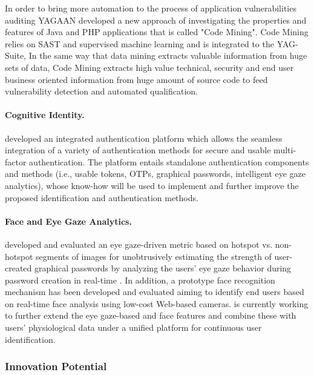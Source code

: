 \documentclass[a4paper,11pt]{article}
\begin{document}
In order to bring more automation to the process of application vulnerabilities auditing YAGAAN developed a new approach of investigating the properties and features of Java and PHP applications that is called "Code Mining". Code Mining relies on SAST and supervised machine learning and is integrated to the YAG-Suite, In the same way that data mining extracts valuable information from huge sets of data, Code Mining extracts high value technical, security and end user business oriented information from huge amount of source code to feed vulnerability detection and automated qualification.

\paragraph{\COGNIshort{} Cognitive Identity.}

\COGNIshort{} developed an integrated authentication platform which allows the seamless integration of a variety of authentication methods for secure and usable multi-factor authentication. The platform entails standalone authentication components and methods (i.e., usable tokens, OTPs, graphical passwords, intelligent eye gaze analytics), whose know-how will be used to implement and further improve the proposed identification and authentication methods.

\paragraph{\COGNIshort{} Face and Eye Gaze Analytics.}

\COGNIshort{} developed and evaluated an eye gaze-driven metric based on hotspot vs. non-hotspot segments of images for unobtrusively estimating the strength of user-created graphical passwords by analyzing the users' eye gaze behavior during password creation in real-time \cite{10.1145/3377325.3377537, 10.1145/3379336.3381460, 10.1145/3320435.3320474}. In addition, a prototype face recognition mechanism has been developed and evaluated aiming to identify end users based on real-time face analysis using low-cost Web-based cameras. \COGNIshort{} is currently working to further extend the eye gaze-based and face features and combine these with users' physiological data under a unified platform for continuous user identification.

\subsubsection{Innovation Potential}
\label{sec:innovationpotential}
\label{innovationpotential}
\end{document}
